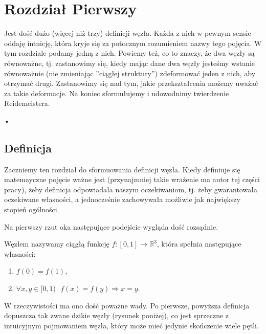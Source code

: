 
\newpage

\section{Rozdział Pierwszy}

Jest dość dużo (więcej niż trzy) definicji węzła. Każda z nich w pewnym sensie oddaję intuicję, która kryje się za potocznym rozumieniem nazwy tego pojęcia. W tym rozdziale podamy 
jedną z nich. 
Powiemy też, co to znaczy, że dwa węzły są równoważne, tj. zastanowimy się, kiedy mając dane dwa węzły jesteśmy wstanie równoważnie (nie zmieniając ''ciągłej struktury'') 
zdeformować jeden z nich, aby otrzymać drugi. Zastanowimy się nad tym, jakie przekształcenia możemy uważać za takie deformacje. Na koniec sformułujemy i udowodnimy 
twierdzenie Reidemeistera.
\begin{flushleft}
•
\end{flushleft}
\subsection{Definicja}

Zaczniemy ten rozdział do sformuowania definicji węzła. Kiedy definiuje się matemayczne pojęcie ważne jest (przynajmniej takie wrażenie ma autor tej części pracy), 
żeby definicja odpowiadała naszym oczekiwaniom, tj. żeby gwarantowała oczekiwane własności, a jednocześnie zachowywała możliwie jak największy 
stopień ogólności. 

Na pierwszy rzut oka następujące podejście wygląda dość rozsądnie.


\begin{definicja}
\label{zla_definicja}
 Węzłem nazywamy ciągłą funkcję $f\colon[0,1]\to\mathbb{R}^3$, która spełnia następujące własności:
 \begin{enumerate}
  \item $f(0) = f(1)$,
  \item $\forall x,y\in[0,1) \ \ \ f(x) = f(y)\Rightarrow x = y$.
 \end{enumerate}
\end{definicja}

W rzeczywistości ma ono dość poważne wady.
Po pierwsze, powyższa definicja dopuszcza tak zwane dzikie węzły (rysunek poniżej), co jest sprzeczne z intuicyjnym pojmowaniem węzła, który może mieć 
jedynie skończenie wiele pętli. 


